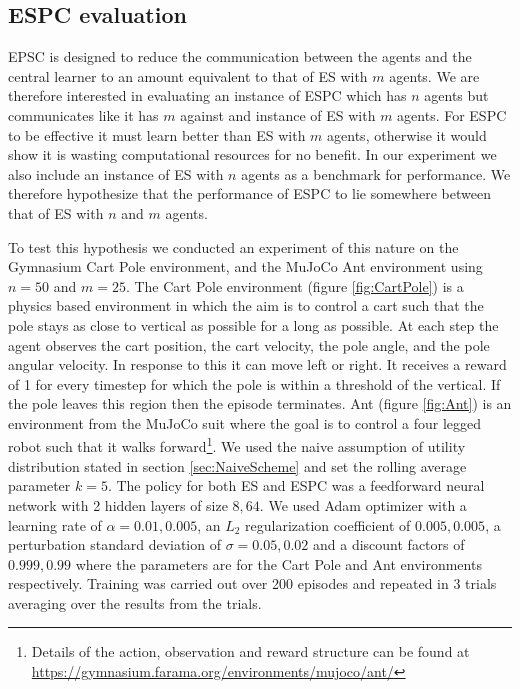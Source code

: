 \subsection{ESPC evaluation}
EPSC is designed to reduce the communication between the agents and the central learner to an amount equivalent to that of ES with $m$ agents. 
We are therefore interested in evaluating an instance of ESPC which has $n$ agents but communicates like it has $m$ against and instance of ES with $m$ agents. 
For ESPC to be effective it must learn better than ES with $m$ agents, otherwise it would show it is wasting computational resources for no benefit. 
In our experiment we also include an instance of ES with $n$ agents as a benchmark for performance. 
We therefore hypothesize that the performance of ESPC to lie somewhere between that of ES with $n$ and $m$ agents.

To test this hypothesis we conducted an experiment of this nature on the Gymnasium Cart Pole environment, and the MuJoCo Ant environment 
using $n=50$ and $m=25$.
The Cart Pole environment (figure \ref{fig:CartPole}) is a physics based environment in which the aim is to control a cart such that the pole stays as close to vertical as possible for a long as possible. 
At each step the agent observes the cart position, the cart velocity, the pole angle, and the pole angular velocity. In response to this it can move left or right. 
It receives a reward of 1 for every timestep for which the pole is within a threshold of the vertical. If the pole leaves this region then the episode terminates. Ant (figure \ref{fig:Ant}) is an environment from the MuJoCo suit where the goal is to control a four legged robot such that it walks forward\footnote{Details of the action, observation and reward structure can be found at \url{https://gymnasium.farama.org/environments/mujoco/ant/}}. We used the naive assumption of utility distribution stated in section \ref{sec:NaiveScheme} and set the rolling average parameter $k=5$. The policy for both ES and ESPC was a feedforward neural network with 2 hidden layers of size $8,64$. We used Adam optimizer \cite{Adam} with a learning rate of $\alpha=0.01,0.005$, an $L_2$ regularization coefficient of $0.005,0.005$, a perturbation standard deviation of $\sigma=0.05,0.02$ and a discount factors of $0.999,0.99$ where the parameters are for the Cart Pole and Ant environments respectively. Training was carried out over 200 episodes and repeated in 3 trials averaging over the results from the trials.
\label{sec:ESPCEval}

